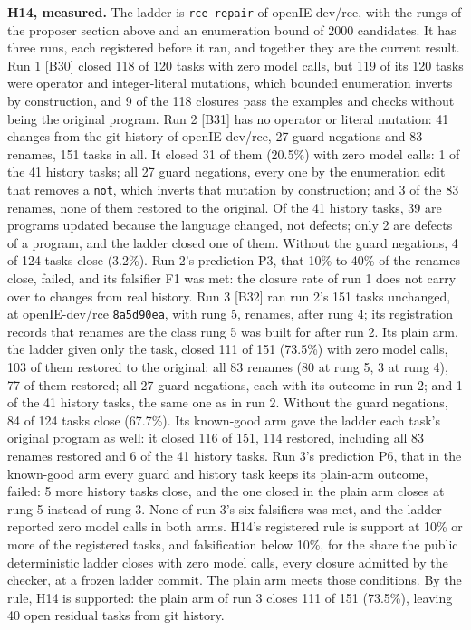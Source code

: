 \documentclass[10pt,letterpaper]{article}
\newcounter{none}
\begin{document}
\textbf{H14, measured.} The ladder is \texttt{rce\ repair} of
openIE-dev/rce, with the rungs of the proposer section above and an
enumeration bound of 2000 candidates. It has three runs, each registered
before it ran, and together they are the current result. Run 1 {[}B30{]}
closed 118 of 120 tasks with zero model calls, but 119 of its 120 tasks
were operator and integer-literal mutations, which bounded enumeration
inverts by construction, and 9 of the 118 closures pass the examples and
checks without being the original program. Run 2 {[}B31{]} has no
operator or literal mutation: 41 changes from the git history of
openIE-dev/rce, 27 guard negations and 83 renames, 151 tasks in all. It
closed 31 of them (20.5\%) with zero model calls: 1 of the 41 history
tasks; all 27 guard negations, every one by the enumeration edit that
removes a \texttt{not}, which inverts that mutation by construction; and
3 of the 83 renames, none of them restored to the original. Of the 41
history tasks, 39 are programs updated because the language changed, not
defects; only 2 are defects of a program, and the ladder closed one of
them. Without the guard negations, 4 of 124 tasks close (3.2\%). Run 2's
prediction P3, that 10\% to 40\% of the renames close, failed, and its
falsifier F1 was met: the closure rate of run 1 does not carry over to
changes from real history. Run 3 {[}B32{]} ran run 2's 151 tasks
unchanged, at openIE-dev/rce \texttt{8a5d90ea}, with rung 5, renames,
after rung 4; its registration records that renames are the class rung 5
was built for after run 2. Its plain arm, the ladder given only the
task, closed 111 of 151 (73.5\%) with zero model calls, 103 of them
restored to the original: all 83 renames (80 at rung 5, 3 at rung 4), 77
of them restored; all 27 guard negations, each with its outcome in run
2; and 1 of the 41 history tasks, the same one as in run 2. Without the
guard negations, 84 of 124 tasks close (67.7\%). Its known-good arm gave
the ladder each task's original program as well: it closed 116 of 151,
114 restored, including all 83 renames restored and 6 of the 41 history
tasks. Run 3's prediction P6, that in the known-good arm every guard and
history task keeps its plain-arm outcome, failed: 5 more history tasks
close, and the one closed in the plain arm closes at rung 5 instead of
rung 3. None of run 3's six falsifiers was met, and the ladder reported
zero model calls in both arms. H14's registered rule is support at 10\%
or more of the registered tasks, and falsification below 10\%, for the
share the public deterministic ladder closes with zero model calls,
every closure admitted by the checker, at a frozen ladder commit. The
plain arm meets those conditions. By the rule, H14 is supported: the
plain arm of run 3 closes 111 of 151 (73.5\%), leaving 40 open residual
tasks from git history.
\end{document}

